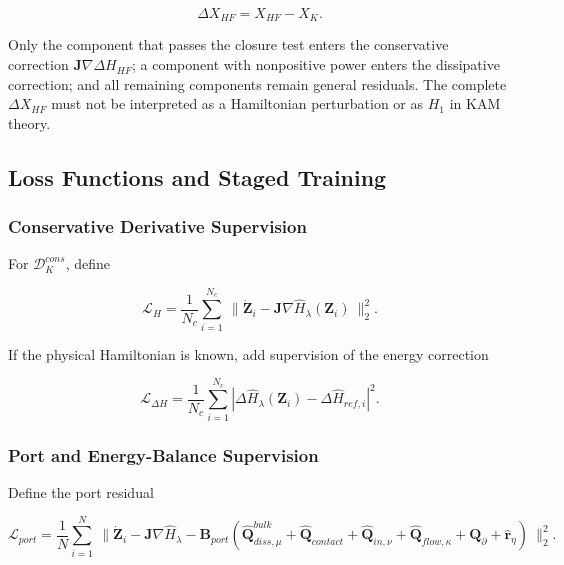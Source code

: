\begin{equation}
\label{eq:chnn-4-22}
\Delta X_{HF} = X_{HF} - X_{K}.
\end{equation}

Only the component that passes the closure test enters the conservative correction \(\mathbf{J}\nabla\Delta H_{HF}\); a component with nonpositive power enters the dissipative correction; and all remaining components remain general residuals. The complete \(\Delta X_{HF}\) must not be interpreted as a Hamiltonian perturbation or as \(H_{1}\) in KAM theory.

\subsection{Loss Functions and Staged Training}\label{sec:chnn-4-5}

\subsubsection{Conservative Derivative Supervision}\label{sec:chnn-4-5-1}

For \(\mathcal{D}_{K}^{cons}\), define

\begin{equation}
\label{eq:chnn-4-23}
\mathcal{L}_{H} = \frac{1}{N_{c}}\sum_{i = 1}^{N_{c}}\left. \  \parallel {\dot{\mathbf{Z}}}_{i} - \mathbf{J}\nabla{\widehat{H}}_{\lambda}\left( \mathbf{Z}_{i} \right) \right.\  \parallel_{2}^{2}.
\end{equation}

If the physical Hamiltonian is known, add supervision of the energy correction

\begin{equation}
\label{eq:chnn-4-24}
\mathcal{L}_{\Delta H} = \frac{1}{N_{c}}\sum_{i = 1}^{N_{c}}\left| \Delta{\widehat{H}}_{\lambda}\left( \mathbf{Z}_{i} \right) - \Delta{\widehat{H}}_{ref,i} \right|^{2}.
\end{equation}

\subsubsection{Port and Energy-Balance Supervision}\label{sec:chnn-4-5-2}

Define the port residual

\begin{equation}
\label{eq:chnn-4-25}
\mathcal{L}_{port} = \frac{1}{N}\sum_{i = 1}^{N}\left. \  \parallel {\dot{\mathbf{Z}}}_{i} - \mathbf{J}\nabla{\widehat{H}}_{\lambda} - \mathbf{B}_{port}\left( {\widehat{\mathbf{Q}}}_{diss,\mu}^{bulk} + {\widehat{\mathbf{Q}}}_{contact} + {\widehat{\mathbf{Q}}}_{in,\nu} + {\widehat{\mathbf{Q}}}_{flow,\kappa} + \mathbf{Q}_{\partial} + {\widehat{\mathbf{r}}}_{\eta} \right) \right.\  \parallel_{2}^{2}.
\end{equation}


